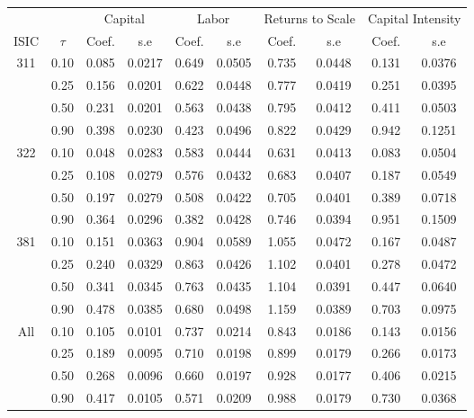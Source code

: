 \begin{table}[H]
\centering
\begin{tabular}{cccccccccc}
  \hline\hline & & \multicolumn{2}{c}{Capital}  & \multicolumn{2}{c}{Labor} & \multicolumn{2}{c}{Returns to Scale} & \multicolumn{2}{c}{Capital Intensity}\\ \cmidrule(lr){3-4} \cmidrule(lr){5-6} \cmidrule(lr){7-8} \cmidrule(lr){9-10}ISIC & $\tau$ & Coef. & s.e & Coef. & s.e & Coef. & s.e & Coef. & s.e \\ 
  \hline
311 & 0.10 & 0.085 & 0.0217 & 0.649 & 0.0505 & 0.735 & 0.0448 & 0.131 & 0.0376 \\ 
   & 0.25 & 0.156 & 0.0201 & 0.622 & 0.0448 & 0.777 & 0.0419 & 0.251 & 0.0395 \\ 
   & 0.50 & 0.231 & 0.0201 & 0.563 & 0.0438 & 0.795 & 0.0412 & 0.411 & 0.0503 \\ 
   & 0.90 & 0.398 & 0.0230 & 0.423 & 0.0496 & 0.822 & 0.0429 & 0.942 & 0.1251 \\ 
  322 & 0.10 & 0.048 & 0.0283 & 0.583 & 0.0444 & 0.631 & 0.0413 & 0.083 & 0.0504 \\ 
   & 0.25 & 0.108 & 0.0279 & 0.576 & 0.0432 & 0.683 & 0.0407 & 0.187 & 0.0549 \\ 
   & 0.50 & 0.197 & 0.0279 & 0.508 & 0.0422 & 0.705 & 0.0401 & 0.389 & 0.0718 \\ 
   & 0.90 & 0.364 & 0.0296 & 0.382 & 0.0428 & 0.746 & 0.0394 & 0.951 & 0.1509 \\ 
  381 & 0.10 & 0.151 & 0.0363 & 0.904 & 0.0589 & 1.055 & 0.0472 & 0.167 & 0.0487 \\ 
   & 0.25 & 0.240 & 0.0329 & 0.863 & 0.0426 & 1.102 & 0.0401 & 0.278 & 0.0472 \\ 
   & 0.50 & 0.341 & 0.0345 & 0.763 & 0.0435 & 1.104 & 0.0391 & 0.447 & 0.0640 \\ 
   & 0.90 & 0.478 & 0.0385 & 0.680 & 0.0498 & 1.159 & 0.0389 & 0.703 & 0.0975 \\ 
  All & 0.10 & 0.105 & 0.0101 & 0.737 & 0.0214 & 0.843 & 0.0186 & 0.143 & 0.0156 \\ 
   & 0.25 & 0.189 & 0.0095 & 0.710 & 0.0198 & 0.899 & 0.0179 & 0.266 & 0.0173 \\ 
   & 0.50 & 0.268 & 0.0096 & 0.660 & 0.0197 & 0.928 & 0.0177 & 0.406 & 0.0215 \\ 
   & 0.90 & 0.417 & 0.0105 & 0.571 & 0.0209 & 0.988 & 0.0179 & 0.730 & 0.0368 \\ 
   \hline
\end{tabular}
\end{table}
